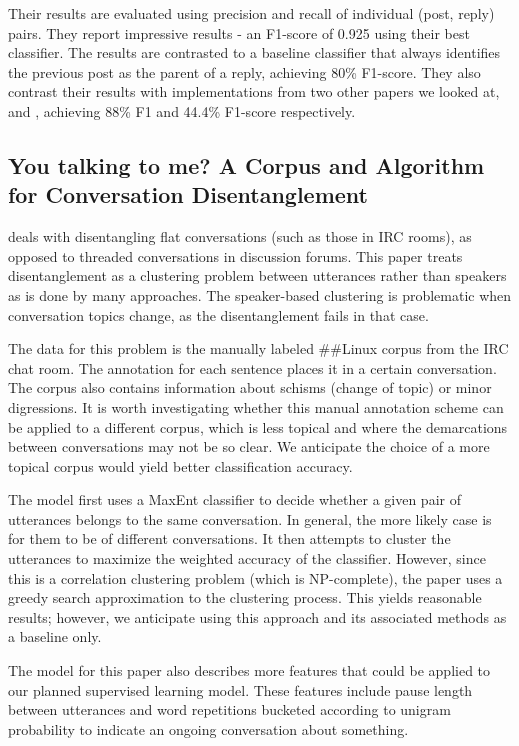 \documentclass{article}
\begin{document}
Their results are evaluated using precision and recall of individual
(post, reply) pairs. They report impressive results - an F1-score of 0.925 using their best
classifier. The results are contrasted to a baseline classifier that always
identifies the previous post as the parent of a reply, achieving 80\% F1-score. 
They also contrast their results with implementations from two other papers we looked at,
\cite{Elsner2008a} and \cite{Wang2008a}, achieving 88\% F1 and 44.4\% F1-score
respectively.

\subsection{You talking to me? A Corpus and Algorithm for Conversation Disentanglement}
\cite{Elsner2008a} deals with disentangling flat conversations (such as those in
IRC rooms),  as opposed to threaded conversations in discussion forums. This
paper treats disentanglement as a clustering problem between utterances rather
than speakers as is done by many approaches. The speaker-based clustering is
problematic when conversation topics change, as the disentanglement fails in
that case.

The data for this problem is the manually labeled \#\#Linux corpus from the IRC
chat room. The annotation for each sentence places it in a certain conversation.
The corpus also contains information about schisms (change of topic) or minor
digressions. It is worth investigating whether this manual annotation scheme can
be applied to a different corpus, which is less topical and where the
demarcations between conversations may not be so clear. We anticipate the choice
of a more topical corpus would yield better classification accuracy.

The model first uses a MaxEnt classifier to decide whether a given pair of
utterances belongs to the same conversation. In general, the more likely case is
for them to be of different conversations. It then attempts to cluster the
utterances to maximize the weighted accuracy of the classifier. However, since
this is a correlation clustering problem (which is NP-complete), the paper uses
a greedy search approximation to the clustering process. This yields reasonable
results; however, we anticipate using this approach and its associated methods
as a baseline only.

The model for this paper also describes more features that could be applied to
our planned supervised learning model. These features include pause length
between utterances and word repetitions bucketed according to unigram
probability to indicate an ongoing conversation about something.
\end{document}
